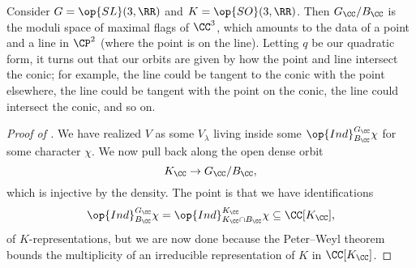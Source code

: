 \documentclass[../notes.tex]{subfiles}
\begin{document}
\begin{example}
	Consider $G=\op{SL}(3,\RR)$ and $K=\op{SO}(3,\RR)$. Then $G_\CC/B_\CC$ is the moduli space of maximal flags of $\CC^3$, which amounts to the data of a point and a line in $\CP^2$ (where the point is on the line). Letting $q$ be our quadratic form, it turns out that our orbits are given by how the point and line intersect the conic; for example, the line could be tangent to the conic with the point elsewhere, the line could be tangent with the point on the conic, the line could intersect the conic, and so on.
\end{example}
\begin{proof}[Proof of ]
	We have realized $V$ as some $V_\lambda$ living inside some $\op{Ind}_{B_\CC}^{G_\CC}\chi$ for some character $\chi$. We now pull back along the open dense orbit
	\[K_\CC\to G_\CC/B_\CC,\]
	which is injective by the density. The point is that we have identifications
	\[\op{Ind}_{B_\CC}^{G_\CC}\chi=\op{Ind}^{K_\CC}_{K_\CC\cap B_\CC}\chi\subseteq\CC[K_\CC],\]
	of $K$-representations, but we are now done because the Peter--Weyl theorem bounds the multiplicity of an irreducible representation of $K$ in $\CC[K_\CC]$.
\end{proof}
\end{document}
